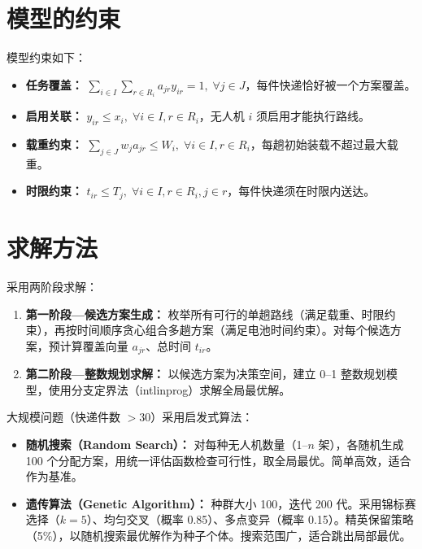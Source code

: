 \documentclass[12pt,a4paper]{article}
\begin{document}
\section{模型的约束}

模型约束如下：

\begin{itemize}[leftmargin=2em]
  \item \textbf{任务覆盖：} $\displaystyle\sum_{i \in I} \sum_{r \in R_i} a_{jr} y_{ir} = 1, \; \forall j \in J$，每件快递恰好被一个方案覆盖。
  \item \textbf{启用关联：} $y_{ir} \leq x_i, \; \forall i \in I, r \in R_i$，无人机 $i$ 须启用才能执行路线。
  \item \textbf{载重约束：} $\displaystyle\sum_{j \in J} w_j a_{jr} \leq W_i, \; \forall i \in I, r \in R_i$，每趟初始装载不超过最大载重。
  \item \textbf{时限约束：} $t_{ir} \leq T_j, \; \forall i \in I, r \in R_i, j \in r$，每件快递须在时限内送达。
\end{itemize}

\section{求解方法}

采用两阶段求解：

\begin{enumerate}[leftmargin=2em]
  \item \textbf{第一阶段---候选方案生成：} 枚举所有可行的单趟路线（满足载重、时限约束），再按时间顺序贪心组合多趟方案（满足电池时间约束）。对每个候选方案，预计算覆盖向量 $a_{jr}$、总时间 $t_{ir}$。
  \item \textbf{第二阶段---整数规划求解：} 以候选方案为决策空间，建立 0--1 整数规划模型，使用分支定界法（intlinprog）求解全局最优解。
\end{enumerate}

大规模问题（快递件数 $> 30$）采用启发式算法：

\begin{itemize}[leftmargin=2em]
  \item \textbf{随机搜索（Random Search）：} 对每种无人机数量（1--$n$ 架），各随机生成 100 个分配方案，用统一评估函数检查可行性，取全局最优。简单高效，适合作为基准。
  \item \textbf{遗传算法（Genetic Algorithm）：} 种群大小 100，迭代 200 代。采用锦标赛选择（$k=5$）、均匀交叉（概率 0.85）、多点变异（概率 0.15）。精英保留策略（5\%），以随机搜索最优解作为种子个体。搜索范围广，适合跳出局部最优。
\end{itemize}
\end{document}
